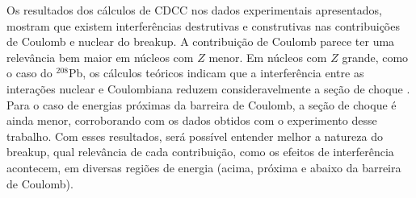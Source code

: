\documentclass[a4paper,12pt,oneside]{book}
\begin{document}
\par Os resultados dos cálculos de CDCC nos dados experimentais apresentados, mostram que existem interferências destrutivas e construtivas nas contribuições de Coulomb e nuclear do breakup. A contribuição de Coulomb parece ter uma relevância bem maior em núcleos com $Z$ menor. Em núcleos com $Z$ grande, como o caso do $^{208}$Pb, os cálculos teóricos indicam que a interferência entre as interações nuclear e Coulombiana reduzem consideravelmente a seção de choque \cite{Kolata2016, MORO_BREAKUP}. Para o caso de energias próximas da barreira de Coulomb, a seção de choque é ainda menor, corroborando com os dados obtidos com o experimento desse trabalho. Com esses resultados, será possível entender melhor a natureza do breakup, qual relevância de cada contribuição, como os efeitos de interferência acontecem, em diversas regiões de energia (acima, próxima e abaixo da barreira de Coulomb).



\end{document}
